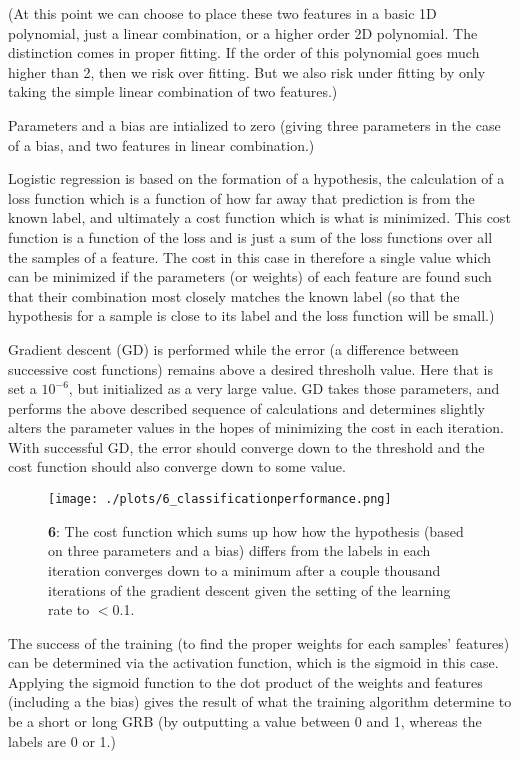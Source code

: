 (At this point we can choose to place these two features in a basic 1D polynomial, just a linear combination, or a higher order 2D polynomial. The distinction comes in proper fitting. If the order of this polynomial goes much higher than 2, then we risk over fitting. But we also risk under fitting by only taking the simple linear combination of two features.)

Parameters and a bias are intialized to zero (giving three parameters in the case of a bias, and two features in linear combination.)

Logistic regression is based on the formation of a hypothesis, the calculation of a loss function which is a function of how far away that prediction is from the known label, and ultimately a cost function which is what is minimized. This cost function is a function of the loss and is just a sum of the loss functions over all the samples of a feature. The cost in this case in therefore a single value which can be minimized if the parameters (or weights) of each feature are found such that their combination most closely matches the known label (so that the hypothesis for a sample is close to its label and the loss function will be small.)

Gradient descent (GD) is performed while the error (a difference between successive cost functions) remains above a desired thresholh value. Here that is set a $10^{-6}$, but initialized as a very large value. GD takes those parameters, and performs the above described sequence of calculations and determines slightly alters the parameter values in the hopes of minimizing the cost in each iteration. With successful GD, the error should converge down to the threshold and the cost function should also converge down to some value.

\begin{figure}[h!]
  \centering
  \texttt{[image: ./plots/6\_classificationperformance.png]}
  \caption{\textbf{6}: The cost function which sums up how how the hypothesis (based on three parameters and a bias) differs from the labels in each iteration converges down to a minimum after a couple thousand iterations of the gradient descent given the setting of the learning rate to $<$0.1.}
  \label{fig:classificationperformance}
\end{figure}

The success of the training (to find the proper weights for each samples' features) can be determined via the activation function, which is the sigmoid in this case. Applying the sigmoid function to the dot product of the weights and features (including a the bias) gives the result of what the training algorithm determine to be a short or long GRB (by outputting a value between 0 and 1, whereas the labels are 0 or 1.)

